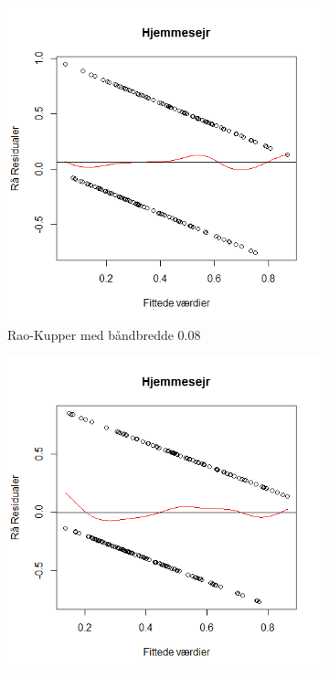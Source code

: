 \documentclass[11pt,a4paper]{article}
\begin{document}
\begin{figure}[h!]
  \centering
  \begin{subfigure}[b]{0.425\linewidth}
    \includegraphics[width=\linewidth]{ResSHS.png}
    \caption{Rao-Kupper med båndbredde 0.08}
    \label{fig:ResSHS}
  \end{subfigure}
  \begin{subfigure}[b]{0.425\linewidth}
    \includegraphics[width=\linewidth]{ResDHS.png}

\end{subfigure}
\end{figure}
\end{document}
